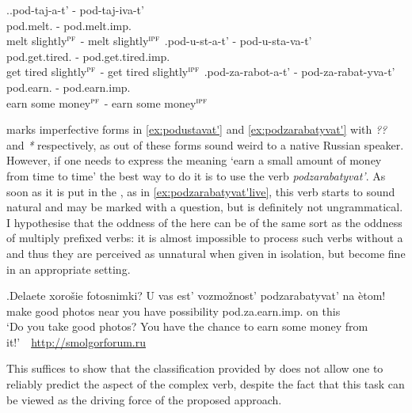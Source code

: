 \ex.\label{ex:pod}\ag.pod-taj-a-t' - pod-taj-iva-t'\\
pod.melt. - pod.melt.imp.\\
melt slightly$^{\textsc{pf}}$ - melt slightly$^{\textsc{ipf}}$
\bg.\label{ex:podustavat'}pod-u-st-a-t' - pod-u-sta-va-t'\\
pod.get.tired. - pod.get.tired.imp.\\
get tired slightly$^{\textsc{pf}}$ - get tired slightly$^{\textsc{ipf}}$
\bg.\label{ex:podzarabatyvat'}pod-za-rabot-a-t' - pod-za-rabat-yva-t'\\
pod.earn. - pod.earn.imp.\\
earn some money$^{\textsc{pf}}$ - earn some money$^{\textsc{ipf}}$

\citet{Kagan:book} marks imperfective forms in \ref{ex:podustavat'} and \ref{ex:podzarabatyvat'} with \textit{??} and \textit{*} respectively, as out of  these forms sound weird to a native Russian speaker. However, if one needs to express the meaning `earn a small amount of money from time to time' the best way to do it is to use the verb \textit{podzarabatyvat'}. As soon as it is put in the , as in \ref{ex:podzarabatyvat'live}, this verb starts to sound natural and may be marked with a question, but is definitely not ungrammatical. I hypothesise that the oddness of the  here can be of the same sort as the oddness of multiply prefixed verbs: it is almost impossible to process such verbs without a  and thus they are perceived as unnatural when given in isolation, but become fine in an appropriate setting.

\exg.\label{ex:podzarabatyvat'live}Delaete xoro\v{s}ie fotosnimki? U vas est' vozmo\v{z}nost' podzarabatyvat' na \`{e}tom!\\
make good photos near you have possibility pod.za.earn.imp. on this\\
\trans `Do you take good photos? You have the chance to earn some money from it!'~~\hbox{}\hfill\hbox{\url{http://smolgorforum.ru}}

This suffices to show that the classification provided by \citet{Tatevosov:07} does not allow one to reliably predict the aspect of the complex verb, despite the fact that this task can be viewed as the driving force of the proposed approach. 

